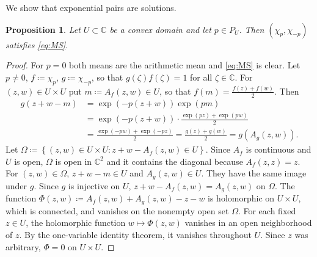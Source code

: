 \documentclass[a4paper, reqno, 11pt]{amsart}
\newtheorem{Prop}[Thm]{Proposition}
\theoremstyle{definition}
\begin{document}
We show that exponential pairs are solutions. 

\begin{Prop}\label{prop:sufficient}
Let $U \subset \mathbb{C}$ be a convex domain and let $p \in P_U$.
Then $(\chi_p, \chi_{-p})$ satisfies \eqref{eq:MS}.
\end{Prop}

\begin{proof}
For $p = 0$ both means are the arithmetic mean and \eqref{eq:MS} is clear.
Let $p \ne 0$, $f \coloneqq  \chi_p$, $g \coloneqq  \chi_{-p}$, so that $g(\zeta) f(\zeta) = 1$ for all $\zeta \in \mathbb{C}$.
For $(z,w) \in U \times U$ put $m \coloneqq  A_f(z,w) \in U$, so that $f(m) = \frac{f(z)+f(w)}{2}$.
Then
\begin{align*}
g(z+w-m) &= \exp(-p(z+w)) \exp(pm) \\
&= \exp(-p(z+w)) \cdot \frac{\exp(pz) + \exp(pw)}{2} \\
&= \frac{\exp(-pw) + \exp(-pz)}{2} = \frac{g(z)+g(w)}{2} = g\left( A_g (z,w) \right) .
\end{align*}
Let $\Omega \coloneqq  \left\{ (z,w) \in U \times U : z + w - A_f(z,w) \in U \right\}$.
Since $A_f$ is continuous and $U$ is open, $\Omega$ is open in $\mathbb{C}^2$ and it contains the diagonal because $A_f(z,z) = z$.
For $(z,w) \in \Omega$,  $z+w-m \in U$ and $A_g(z,w) \in U$. 
They have the same image under $g$. 
Since $g$ is injective on $U$, $z + w - A_f(z,w) = A_g(z,w)$ on $\Omega$.
The function $\Phi(z,w) \coloneqq  A_f(z,w) + A_g(z,w) - z - w$ is holomorphic on $U \times U$, which is connected, and vanishes on the nonempty open set $\Omega$. 
For each fixed $z\in U$, the holomorphic function $w \mapsto \Phi(z,w)$ vanishes in an open neighborhood of $z$. 
By the one-variable identity theorem, it vanishes throughout $U$. 
Since $z$ was arbitrary, $\Phi = 0$ on $U\times U$.
\end{proof}
\end{document}
